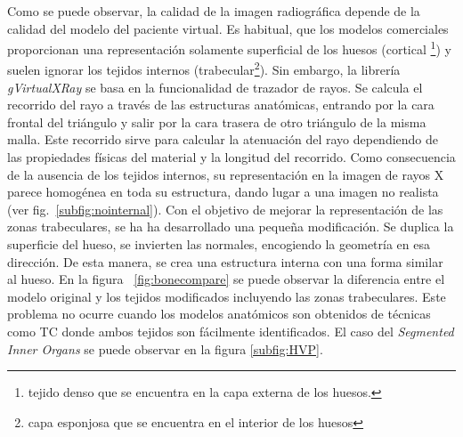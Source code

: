 Como se puede observar, la calidad de la imagen radiográfica depende de la calidad del modelo del paciente virtual. %
Es habitual, que los modelos comerciales proporcionan una representación solamente superficial de los huesos (cortical \footnote{tejido denso que se encuentra en la capa externa de los huesos.}) y suelen ignorar los tejidos internos (trabecular\footnote{capa esponjosa que se encuentra en el interior de los huesos}). Sin embargo, la librería \emph{gVirtualXRay} se basa en la funcionalidad de trazador de rayos. Se calcula el recorrido del rayo a través de las estructuras anatómicas, entrando por la cara frontal del triángulo y salir por la cara trasera de otro triángulo de la misma malla. Este recorrido sirve para calcular la atenuación del rayo dependiendo de las propiedades físicas del material y la longitud del recorrido. Como consecuencia de la ausencia de los tejidos internos, su representación en la imagen de rayos X parece homogénea en toda su estructura, dando lugar a una imagen no realista (ver fig.~\ref{subfig:nointernal}). Con el objetivo de mejorar la representación de las zonas trabeculares, se ha ha desarrollado una pequeña modificación. Se duplica la superficie del hueso, se invierten las normales, encogiendo la geometría en esa dirección. De esta manera, se crea una estructura interna con una forma similar al hueso. En la figura ~\ref{fig:bonecompare} se puede observar la diferencia entre el modelo original y los tejidos modificados incluyendo las zonas trabeculares. Este problema no ocurre cuando los modelos anatómicos son obtenidos de técnicas como \ac{TC} donde ambos tejidos son fácilmente identificados. El caso del  
\emph{Segmented Inner Organs}\cite{VoxelMan} se puede observar en la figura \ref{subfig:HVP}.




